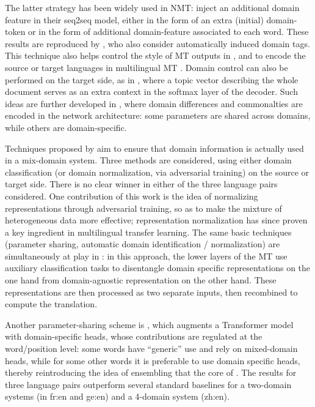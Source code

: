 \documentclass[11pt,a4paper]{article}
\newcommand{\fyTodo}[1]{\Todo[FY:]{\textcolor{orange}{#1}}}
\begin{document}
The latter strategy has been widely used in NMT:  inject an additional domain feature in their seq2seq model, either in the form of an extra (initial) domain-token or in the form of additional domain-feature associated to each word. These results are reproduced by , who also consider automatically induced domain tags. This technique also helps control the style of MT outputs in \cite{Sennrich16politeness,Niu18multitask}, and to encode the source or target languages in multilingual MT \cite{Firat16multiway,Johnson17google}. Domain control can also be performed on the target side, as in \cite{Chen16guided}, where a topic vector describing the whole document serves as an extra context in the softmax layer of the decoder. Such ideas are further developed in \cite{Chu18multilingual,Pham19generic}, where domain differences and commonalties are encoded in the network architecture: some parameters are shared across domains, while others are domain-specific. %

Techniques proposed by \cite{Britz17mixing} aim to ensure that domain information is actually used in a mix-domain system. Three methods are considered, using either domain classification (or domain normalization, via adversarial training) on the source or target side. There is no clear winner in either of the three language pairs considered. One contribution of this work is the idea of normalizing representations through adversarial training, so as to make the mixture of heterogeneous data more effective; representation normalization has since proven a key ingredient in multilingual transfer learning.
The same basic techniques (parameter sharing, automatic domain identification / normalization) are simultaneously at play in \cite{Zeng18multidomain,Su19exploring}: in this approach, the lower layers of the MT use auxiliary classification tasks to disentangle domain specific representations on the one hand from domain-agnostic representation on the other hand. These representations are then processed as two separate inputs, then recombined to compute the translation.

Another parameter-sharing scheme is \cite{Jiang19multidomain}, which augments a Transformer model with domain-specific heads, whose contributions are regulated at the word/position level: some words have ``generic'' use and rely on mixed-domain heads, while for some other words it is preferable to use domain specific heads, thereby reintroducing the idea of ensembling that the core of \cite{Huck15mixeddomain,Saunders19ucam}. The results for three language pairs outperform several standard baselines for a two-domain systems (in fr:en and ge:en) and a 4-domain system (zh:en).%
\end{document}
